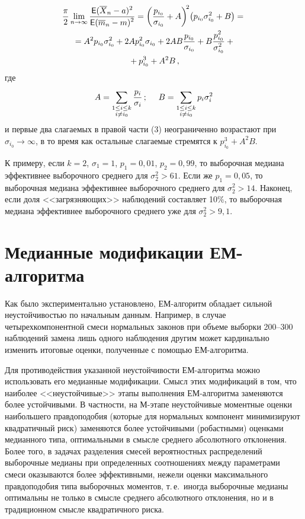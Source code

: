 \begin{multicols}{2}
\begin{multline}
\displaystyle\frac{\displaystyle \pi\mathstrut}{\displaystyle 2\mathstrut}\lim_{n\to\infty}\displaystyle\frac{\displaystyle {\sf E}(\overline X_n-a)^2\mathstrut}{\displaystyle {\sf
E}(\overline
m_n-m)^2\mathstrut}=\bigg(\displaystyle\frac{\displaystyle p_{i_0}\mathstrut}{\displaystyle \sigma_{i_0}\mathstrut}+A{\bigg)\!}^2\big(p_{i_0}\sigma_{i_0}^2+B\big)={}
\\{}
=A^2p_{i_0}\sigma_{i_0}^2+2Ap_{i_0}^2\sigma_{i_0}+2AB\displaystyle\frac{\displaystyle p_{i_0}\mathstrut}{\displaystyle \sigma_{i_0}\mathstrut}+
B\displaystyle\frac{\displaystyle p_{i_0}^2\mathstrut}{\displaystyle \sigma_{i_0}^2\mathstrut}+{}\\
{}+ p_{i_0}^3+A^2B\,,
\end{multline}
где
$$
A=\sum\limits_{\substack{{1\le i\le k}\\{i\neq i_0}}}\displaystyle\frac{\displaystyle p_i\mathstrut}{\displaystyle \sigma_i\mathstrut}\,;\ \ \ \
B=\sum\limits_{\substack{{1\le i\le k}\\{i\neq i_0}}}p_i\sigma_i^2
$$
и первые два слагаемых в правой части (3) неограниченно возрастают
при $\sigma_{i_0}\to\infty$, в то время как остальные слагаемые
стремятся к $p_{i_0}^3+A^2B$.

К примеру, если $k=2$, $\sigma_1=1$, $p_1=0{,}01$, $p_2=0{,}99$, то
выборочная медиана эффективнее выборочного среднего для
$\sigma_2^2>61$. Если же $p_1=0{,}05$, то выборочная медиана
эффективнее выборочного среднего для $\sigma_2^2>14$. Наконец,
если доля <<загрязняющих>> наблюдений составляет 10\%, то
выборочная медиана эффективнее выборочного среднего уже для
$\sigma_2^2>9{,}1$.

\section{Медианные модификации ЕМ-алгоритма}

Как было экспериментально установлено, ЕМ-алгоритм обладает
сильной неустойчивостью по начальным данным. Например, в случае
четырехкомпонентной смеси нормальных законов при объеме выборки
200--300 наблюдений замена лишь одного наблюдения другим может
кардинально изменить итоговые оценки, полученные с помощью
ЕМ-алгоритма.

Для противодействия указанной неустой\-чи\-вости ЕМ-алгоритма можно
использовать его медианные модификации. Смысл этих модификаций в
том, что наиболее <<неустойчи\-вые>> этапы выполнения ЕМ-алгоритма
заменяются более устойчивыми. В частности, на М-этапе неустойчивые
моментные оценки наибольшего правдоподобия (которые для нормальных
компонент минимизируют квадратичный риск) заменяются более
устойчивыми (робастными) оценками медианного типа, оптимальными в
смысле среднего абсолютного отклонения. Более того, в задачах
разделения смесей вероятностных распределений выборочные медианы
при определенных соотношениях между параметрами смеси оказываются
более эффективными, нежели оценки максимального правдоподобия типа
выборочных моментов, т.\,е.\ иногда выборочные медианы оптимальны
не только в смысле среднего абсолютного отклонения, но и в
традиционном смысле квадратичного риска.


\end{multicols}
